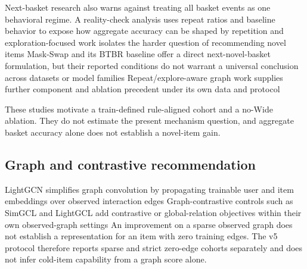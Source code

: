 \documentclass[10pt,a4paper]{article}
\begin{document}
Next-basket research also warns against treating all basket events as one
behavioral regime. A reality-check analysis uses repeat ratios and baseline
behavior to expose how aggregate accuracy can be shaped by repetition
\cite{li2023_nbr_reality} %
and exploration-focused work isolates the harder question of recommending novel
items
\cite{li2023_repetition_exploration} %
Mask-Swap and its BTBR baseline offer a direct next-novel-basket formulation,
but their reported conditions do not warrant a universal conclusion across
datasets or model families
\cite{li2023_mask_swap} %
Repeat/explore-aware graph work supplies further component and ablation
precedent under its own data and protocol
\cite{mansouri2026_repeat_explore_lightgcn} %

These studies motivate a train-defined rule-aligned cohort and a no-Wide
ablation. They do not estimate the present mechanism question, and aggregate
basket accuracy alone does not establish a novel-item gain.

\subsection{Graph and contrastive recommendation}

LightGCN simplifies graph convolution by propagating trainable user and item
embeddings over observed interaction edges
\cite{he2020_lightgcn} %
Graph-contrastive controls such as SimGCL and LightGCL add contrastive or
global-relation objectives within their own observed-graph settings
\cite{yu2022_simgcl} %
\cite{cai2023_lightgcl} %
An improvement on a sparse observed graph does not establish a representation
for an item with zero training edges. The v5 protocol therefore reports sparse
and strict zero-edge cohorts separately and does not infer cold-item capability
from a graph score alone.
\end{document}
